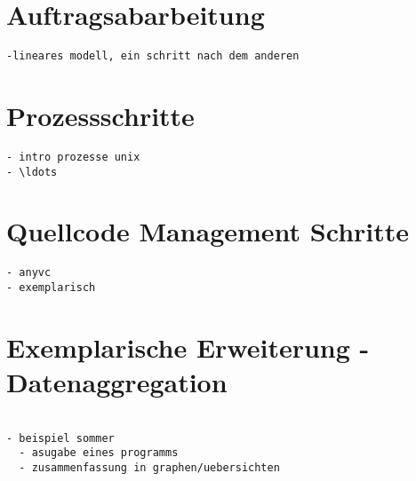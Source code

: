 \section{Auftragsabarbeitung}
\begin{verbatim}
-lineares modell, ein schritt nach dem anderen
\end{verbatim}

\section{Prozessschritte}

\begin{verbatim}
- intro prozesse unix
- \ldots
\end{verbatim}

\section{Quellcode Management Schritte}


\begin{verbatim}
- anyvc
- exemplarisch
\end{verbatim}

\section{Exemplarische Erweiterung - Datenaggregation}

\begin{verbatim}

- beispiel sommer
  - asugabe eines programms
  - zusammenfassung in graphen/uebersichten

\end{verbatim}

